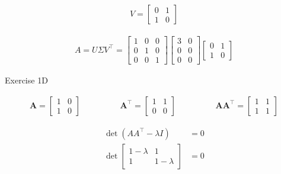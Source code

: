 \documentclass[11pt,letterpaper]{article}
\begin{document}
\begin{enumerate}
\begin{align*}
V = {\begin{bmatrix}
        0 & 1 \\
        1 & 0
    \end{bmatrix}}
\end{align*}

\begin{align*}
A = U \Sigma V^\top
= \begin{bmatrix}
        1 & 0 & 0\\
        0 & 1 & 0 \\
        0 & 0 & 1
    \end{bmatrix}
    \begin{bmatrix}
        3 & 0 \\
        0 & 0 \\
        0 & 0
    \end{bmatrix}
    \begin{bmatrix}
        0 & 1 \\
        1 & 0
    \end{bmatrix}
\end{align*}

\noindent\dotfill Exercise 1D \noindent\dotfill

\begin{align*}
    \mathbf{A} 
    = \begin{bmatrix}
        1 & 0 \\
        1 & 0
    \end{bmatrix}
    \hspace{2cm}
    \mathbf{A^\top} 
    = \begin{bmatrix}
        1 & 1 \\
        0 & 0
    \end{bmatrix}
    \hspace{2cm}
    \mathbf{A A^\top} 
    = \begin{bmatrix}
        1 & 1 \\
        1 & 1
    \end{bmatrix}
\end{align*}

\begin{align*}
\det{(AA^\top - \lambda I)} &= 0 \\
\det{\begin{bmatrix}
        1-\lambda & 1 \\
        1 & 1-\lambda
    \end{bmatrix}} &= 0
\end{align*}


\end{enumerate}
\end{document}
